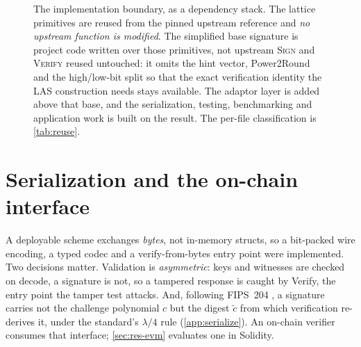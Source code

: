 \begin{figure}[htbp]
  \caption[What is reused, what is simplified, and what the project adds]{The
  implementation boundary, as a dependency stack. The lattice primitives are reused from
  the pinned upstream reference and \emph{no upstream function is modified}. The
  simplified base signature is project code written over those primitives, not upstream
  \textsc{Sign} and \textsc{Verify} reused untouched: it omits the hint vector,
  Power2Round and the high/low-bit split so that the exact verification identity the LAS
  construction needs stays available. The adaptor layer is added above that base, and the
  serialization, testing, benchmarking and application work is built on the result. The
  per-file classification is \cref{tab:reuse}.}
  \label{fig:reusestack}
\end{figure}

\section{Serialization and the on-chain interface}
\label{sec:serialize}

A deployable scheme exchanges \emph{bytes}, not in-memory structs, so a bit-packed wire
encoding, a typed codec and a verify-from-bytes entry point were implemented.
Two decisions matter. Validation is \emph{asymmetric}: keys and witnesses are checked on
decode, a signature is not, so a tampered response is caught by Verify, the entry
point the tamper test attacks. And, following FIPS~204
\cite{1274601}, a signature carries not the challenge polynomial $c$ but the digest
$\tilde c$ from which verification re-derives it, under the standard's $\lambda/4$ rule
(\cref{app:serialize}).
An on-chain verifier consumes that interface;
\cref{sec:res-evm} evaluates one in Solidity.

